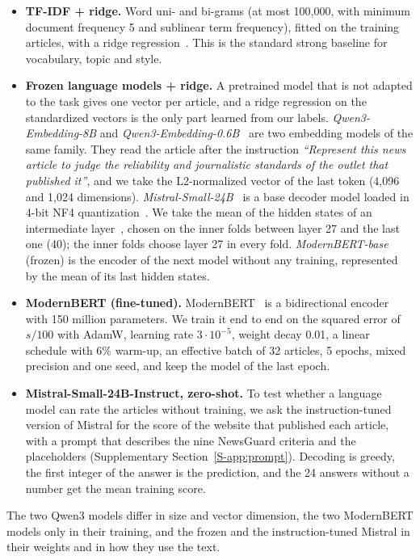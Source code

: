 \documentclass[11pt,a4paper]{article}
\begin{document}
\begin{itemize}
  \item \textbf{TF-IDF + ridge.} Word uni- and bi-grams (at most 100,000, with minimum document frequency 5 and sublinear
        term frequency), fitted on the training articles, with a ridge regression~\cite{hoerl1970ridge}. This is the
        standard strong baseline for vocabulary, topic and style.
  \item \textbf{Frozen language models + ridge.} A pretrained model that is not adapted to the task gives one vector per
        article, and a ridge regression on the standardized vectors is the only part learned from our labels.
        \emph{Qwen3-Embedding-8B} and \emph{Qwen3-Embedding-0.6B}~\cite{zhang2025qwen3} are two embedding models of the
        same family. They read the article after the instruction \emph{``Represent this news article to judge the
        reliability and journalistic standards of the outlet that published it''}, and we take the L2-normalized vector
        of the last token (4,096 and 1,024 dimensions). \emph{Mistral-Small-24B}~\cite{mistralsmall} is a base decoder
        model loaded in 4-bit NF4 quantization~\cite{dettmers2023qlora}. We take the mean of the hidden states of an
        intermediate layer~\cite{skean2025layer}, chosen on the inner folds between layer 27 and the last one (40); the
        inner folds choose layer 27 in every fold. \emph{ModernBERT-base} (frozen) is the encoder of the next model
        without any training, represented by the mean of its last hidden states.
  \item \textbf{ModernBERT (fine-tuned).} ModernBERT~\cite{warner2024modernbert} is a bidirectional encoder with 150
        million parameters. We train it end to end on the squared error of $s/100$ with AdamW, learning rate
        $3 \cdot 10^{-5}$, weight decay 0.01, a linear schedule with 6\% warm-up, an effective batch of 32 articles,
        5 epochs, mixed precision and one seed, and keep the model of the last epoch.
  \item \textbf{Mistral-Small-24B-Instruct, zero-shot.} To test whether a language model can rate the articles without
        training, we ask the instruction-tuned version of Mistral for the score of the website that published each
        article, with a prompt that describes the nine NewsGuard criteria and the placeholders (Supplementary
        Section~\ref{S-app:prompt}). Decoding is greedy, the first integer of the answer is the prediction, and the 24
        answers without a number get the mean training score.
\end{itemize}
The two Qwen3 models differ in size and vector dimension, the two ModernBERT models only in their training, and the
frozen and the instruction-tuned Mistral in their weights and in how they use the text.
\end{document}
